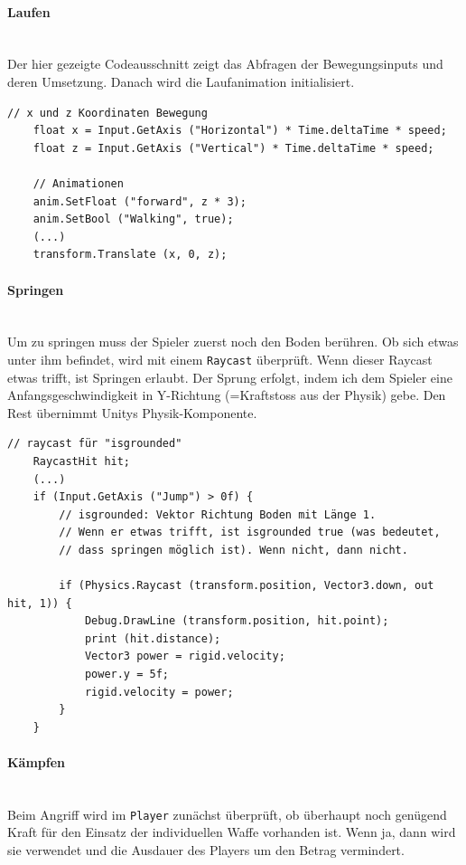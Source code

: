 \paragraph{Laufen}\mbox{} \\
Der hier gezeigte Codeausschnitt zeigt das Abfragen der Bewegungsinputs und deren Umsetzung.
Danach wird die Laufanimation initialisiert.

\begin{lstlisting}[caption={Laufen}]
	// x und z Koordinaten Bewegung
	float x = Input.GetAxis ("Horizontal") * Time.deltaTime * speed;
	float z = Input.GetAxis ("Vertical") * Time.deltaTime * speed;
        
	// Animationen
	anim.SetFloat ("forward", z * 3);
	anim.SetBool ("Walking", true);
	(...)
	transform.Translate (x, 0, z);
\end{lstlisting}

\paragraph{Springen}\mbox{} \\
Um zu springen muss der Spieler zuerst noch den Boden berühren.
Ob sich etwas unter ihm befindet, wird mit einem \lstinline{Raycast} überprüft.
Wenn dieser Raycast etwas trifft, ist Springen erlaubt.
Der Sprung erfolgt, indem ich dem Spieler eine Anfangsgeschwindigkeit in Y-Richtung (=Kraftstoss aus der Physik) gebe. Den Rest übernimmt Unitys Physik-Komponente.

\begin{lstlisting}[caption={Springen}]
	// raycast für "isgrounded"
	RaycastHit hit;
	(...)
	if (Input.GetAxis ("Jump") > 0f) {
		// isgrounded: Vektor Richtung Boden mit Länge 1. 
		// Wenn er etwas trifft, ist isgrounded true (was bedeutet,
		// dass springen möglich ist). Wenn nicht, dann nicht. 

		if (Physics.Raycast (transform.position, Vector3.down, out hit, 1)) {
			Debug.DrawLine (transform.position, hit.point);
			print (hit.distance);
			Vector3 power = rigid.velocity;
			power.y = 5f;
			rigid.velocity = power;
		}
	}
\end{lstlisting}

\paragraph{Kämpfen}\mbox{} \\

Beim Angriff wird im \lstinline{Player} zunächst überprüft, ob überhaupt noch genügend Kraft für den Einsatz der individuellen Waffe vorhanden ist. Wenn ja, dann wird sie verwendet und die Ausdauer des Players um den Betrag vermindert.


